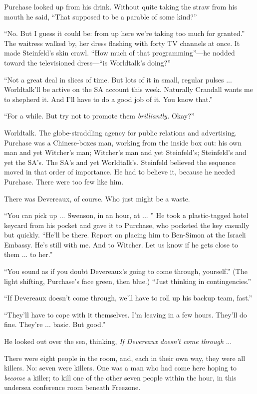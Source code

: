 Purchase looked up from his drink. Without quite taking the straw from his mouth he said, ``That supposed to be a parable of some kind?''

``No. But I guess it could be: from up here we're taking too much for granted.'' The waitress walked by, her dress flashing with forty TV channels at once. It made Steinfeld's skin crawl. ``How much of that programming''---he nodded toward the televisioned dress---``is Worldtalk's doing?''

``Not a great deal in slices of time. But lots of it in small, regular pulses ... Worldtalk'll be active on the SA account this week. Naturally Crandall wants me to shepherd it. And I'll have to do a good job of it. You know that.''

``For a while. But try not to promote them \textit{brilliantly.} Okay?''

Worldtalk. The globe-straddling agency for public relations and advertising. Purchase was a Chinese-boxes man, working from the inside box out: his own man and yet Witcher's man; Witcher's man and yet Steinfeld's; Steinfeld's and yet the SA's. The SA's and yet Worldtalk's. Steinfeld believed the sequence moved in that order of importance. He had to believe it, because he needed Purchase. There were too few like him.

There was Devereaux, of course. Who just might be a waste.

``You can pick up ... Swenson, in an hour, at ... '' He took a plastic-tagged hotel keycard from his pocket and gave it to Purchase, who pocketed the key casually but quickly. ``He'll be there. Report on placing him to Ben-Simon at the Israeli Embassy. He's still with me. And to Witcher. Let us know if he gets close to them ... to her.''

``You sound as if you doubt Devereaux's going to come through, yourself.'' (The light shifting, Purchase's face green, then blue.) ``Just thinking in contingencies.''

``If Devereaux doesn't come through, we'll have to roll up his backup team, fast.''

``They'll have to cope with it themselves. I'm leaving in a few hours. They'll do fine. They're ... basic. But good.''

He looked out over the sea, thinking, \textit{If Devereaux doesn't come through} ...

There were eight people in the room, and, each in their own way, they were all killers. No: seven were killers. One was a man who had come here hoping to \textit{become} a killer; to kill one of the other seven people within the hour, in this undersea conference room beneath Freezone.

